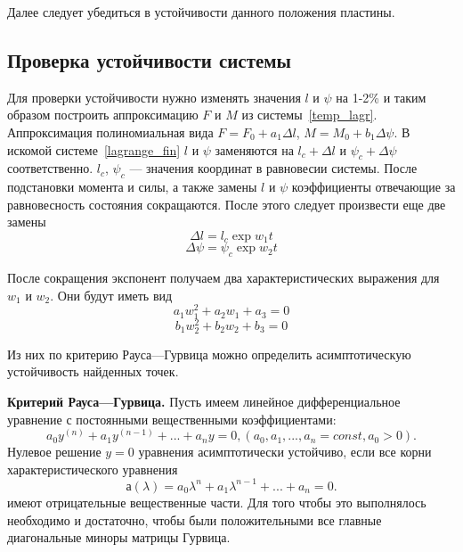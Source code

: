 \documentclass[a4paper,14pt]{extarticle}
\begin{document}
Далее следует убедиться в устойчивости данного положения пластины.


\subsection{Проверка устойчивости системы}
Для проверки устойчивости нужно изменять значения $l$ и $\psi$ на 1-2\% и таким образом построить аппроксимацию $F$ и $M$ из системы~\eqref{temp_lagr}. Аппроксимация полиномиальная вида $F = F_0 + a_1 \Delta{l}$, $M = M_0 + b_1 \Delta{\psi}$.
В искомой системе~\eqref{lagrange_fin} $l$ и $\psi$ заменяются на $l_c + \Delta{l}$ и $\psi_c + \Delta{\psi}$ соответственно. $l_c$, $\psi_c$ --- значения координат в равновесии системы. После подстановки момента и силы, а также замены $l$ и $\psi$ коэффициенты отвечающие за равновесность состояния сокращаются. После этого следует произвести еще две замены
\begin{equation*}
	\Delta{l} = l_c \exp{w_1 t}
\end{equation*}
\begin{equation*}
	\Delta{\psi} = \psi_c \exp{w_2 t}
\end{equation*}

После сокращения экспонент получаем два характеристических выражения для $w_1$ и $w_2$.
Они будут иметь вид
\begin{equation*} 
     a_1 w_1^2	+ a_2 w_1 + a_3= 0
\end{equation*}
\begin{equation*}
	b_1 w_2^2	+ b_2 w_2 + b_3= 0
\end{equation*}

Из них по критерию Рауса—Гурвица можно определить асимптотическую устойчивость найденных точек.

\textbf{Критерий Рауса—Гурвица.}
Пусть имеем линейное дифференциальное уравнение с постоянными вещественными коэффициентами:
\begin{equation*}
	a_0 y^{(n)} + a_1 y^{(n - 1)} + ... + a_n y  = 0, (a_0, a_1, ..., a_n = const, a_0 > 0).
\end{equation*}
Нулевое решение $y = 0$ уравнения асимптотически устойчиво, если все корни характеристического уравнения 
\begin{equation*}
	а(\lambda) = a_0 \lambda^n + a_1 \lambda^{n - 1} + ... + a_n = 0.
\end{equation*}
имеют отрицательные вещественные части. Для того чтобы это выполнялось необходимо и достаточно, чтобы были положительными все главные диагональные миноры матрицы Гурвица.
\end{document}

